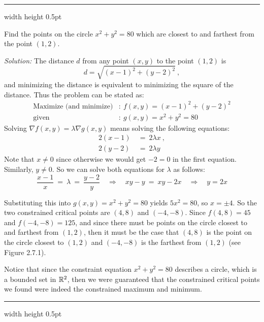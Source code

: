 \hrule width \textwidth height 0.5pt
\begin{exmp}
 Find the points on the circle $x^2 + y^2 = 80$ which are closest to and farthest from the point $(1,2)$.\smallskip
 \par\noindent \emph{Solution:} The distance $d$ from any point $(x,y)$ to the point $(1,2)$ is
 \begin{displaymath}
  d = \sqrt{(x-1)^2 + (y-2)^2} ~,
 \end{displaymath}
 and minimizing the distance is equivalent to minimizing the square of the distance. Thus the problem can be stated as:
 \begin{align*}
  \text{Maximize (and minimize)}&: ~ f(x,y) = (x-1)^2 + (y-2)^2\\
  \text{given}&: ~ g(x,y) = x^2 + y^2 = 80
 \end{align*}
 Solving $\nabla f(x,y) = \lambda \nabla g(x,y)$ means solving the following equations:
 \begin{align*}
  2(x-1) ~&=~ 2\lambda x ~,\\
  2(y-2) ~&=~ 2\lambda y
 \end{align*}
 Note that $x \ne 0$ since otherwise we would get $-2=0$ in the first equation. Similarly, $y \ne 0$.
 So we can solve both equations for $\lambda$ as follows:
 \begin{displaymath}
  \frac{x-1}{x} ~=~ \lambda ~=~ \frac{y-2}{y} \quad \Rightarrow \quad xy-y ~= ~xy-2x \quad \Rightarrow \quad y=2x
 \end{displaymath}

 \piccaption[]{}
 Substituting this into $g(x,y) = x^2 + y^2 = 80$ yields $5x^2=80$, so $x=\pm 4$. So the two constrained critical
 points are $(4,8)$ and $(-4,-8)$. Since $f(4,8)=45$ and $f(-4,-8)=125$, and since there must be points on the circle
 closest to and farthest from $(1,2)$, then it must be the case that $(4,8)$ is the point on the circle
 closest to $(1,2)$ and $(-4,-8)$ is the farthest from $(1,2)$ (see Figure 2.7.1).
 
 Notice that since the constraint equation $x^2 + y^2 = 80$ describes a circle, which is a bounded set in $\mathbb{R}^{2}$,
 then we were guaranteed that the constrained critical points we found were indeed the constrained maximum and
 minimum.
\end{exmp}
\hrule width \textwidth height 0.5pt
\medskip

